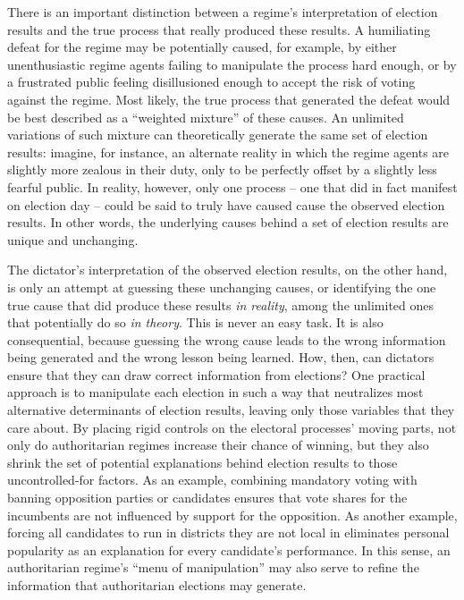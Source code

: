 \documentclass[12pt]{article}
\newcommand{\1}{\mathbbm{1}}
\begin{document}
There is an important distinction between a regime's interpretation of election results and the true process that really produced these results. A humiliating defeat for the regime may be potentially caused, for example, by either unenthusiastic regime agents failing to manipulate the process hard enough, or by a frustrated public feeling disillusioned enough to accept the risk of voting against the regime. Most likely, the true process that generated the defeat would be best described as a ``weighted mixture'' of these causes. An unlimited variations of such mixture can theoretically generate the same set of election results: imagine, for instance, an alternate reality in which the regime agents are slightly more zealous in their duty, only to be perfectly offset by a slightly less fearful public. In reality, however, only one process -- one that did in fact manifest on election day -- could be said to truly have caused cause the observed election results. In other words, the underlying causes behind a set of election results are unique and unchanging. 

The dictator's interpretation of the observed election results, on the other hand, is only an attempt at guessing these unchanging causes, or identifying the one true cause that did produce these results \textit{in reality}, among the unlimited ones that potentially do so \textit{in theory}. This is never an easy task. It is also consequential, because guessing the wrong cause leads to the wrong information being generated and the wrong lesson being learned. How, then, can dictators ensure that they can draw correct information from elections? One practical approach is to manipulate each election in such a way that neutralizes most alternative determinants of election results, leaving only those variables that they care about. By placing rigid controls on the electoral processes' moving parts, not only do authoritarian regimes increase their chance of winning, but they also shrink the set of potential explanations behind election results to those uncontrolled-for factors. As an example, combining mandatory voting with banning opposition parties or candidates ensures that vote shares for the incumbents are not influenced by support for the opposition. As another example, forcing all candidates to run in districts they are not local in eliminates personal popularity as an explanation for every candidate's performance. In this sense, an authoritarian regime's ``menu of manipulation'' \citep{Schedler2002menu} may also serve to refine the information that authoritarian elections may generate.
\end{document}
